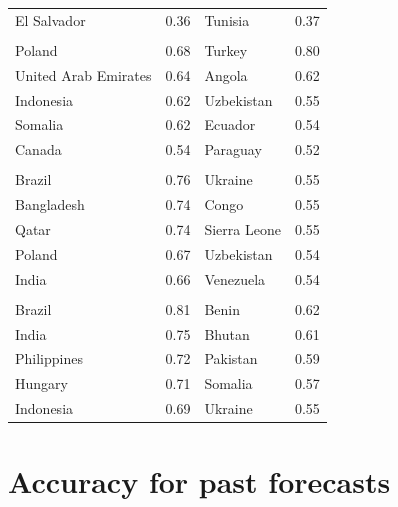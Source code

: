 \documentclass[
  11pt,
]{article}
\begin{document}
\begin{table}
\begin{tabular}[t]{>{\raggedright\arraybackslash}p{12em}r>{\raggedright\arraybackslash}p{10em}r}
\hspace{1em}El Salvador & 0.36 & Tunisia & 0.37\\
\addlinespace[0.3em]
\multicolumn{4}{l}{\textbf{Governing}}\\
\hspace{1em}Poland & 0.68 & Turkey & 0.80\\
\hspace{1em}United Arab Emirates & 0.64 & Angola & 0.62\\
\hspace{1em}Indonesia & 0.62 & Uzbekistan & 0.55\\
\hspace{1em}Somalia & 0.62 & Ecuador & 0.54\\
\hspace{1em}Canada & 0.54 & Paraguay & 0.52\\
\addlinespace[0.3em]
\multicolumn{4}{l}{\textbf{Individual}}\\
\hspace{1em}Brazil & 0.76 & Ukraine & 0.55\\
\hspace{1em}Bangladesh & 0.74 & Congo & 0.55\\
\hspace{1em}Qatar & 0.74 & Sierra Leone & 0.55\\
\hspace{1em}Poland & 0.67 & Uzbekistan & 0.54\\
\hspace{1em}India & 0.66 & Venezuela & 0.54\\
\addlinespace[0.3em]
\multicolumn{4}{l}{\textbf{Informational}}\\
\hspace{1em}Brazil & 0.81 & Benin & 0.62\\
\hspace{1em}India & 0.75 & Bhutan & 0.61\\
\hspace{1em}Philippines & 0.72 & Pakistan & 0.59\\
\hspace{1em}Hungary & 0.71 & Somalia & 0.57\\
\hspace{1em}Indonesia & 0.69 & Ukraine & 0.55\\
\bottomrule
\end{tabular}
\end{table}

\hypertarget{accuracy-for-past-forecasts}{%
\section{Accuracy for past
forecasts}\label{accuracy-for-past-forecasts}}
\end{document}

